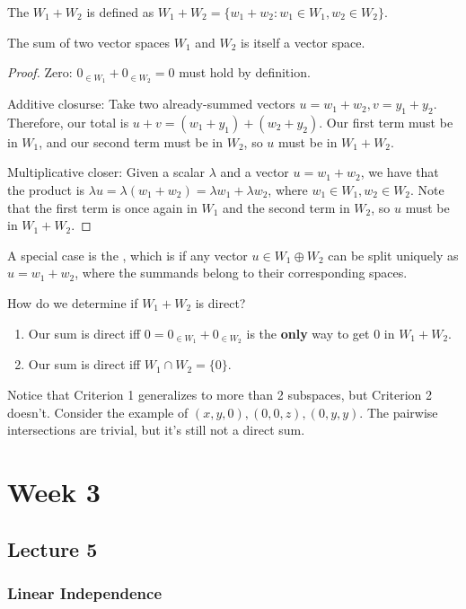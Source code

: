 \documentclass{book}
\begin{document}
\begin{definition}
	The  $W_1 + W_2$ is defined as $W_1 + W_2 = \{w_1 + w_2 : w_1 \in W_1, w_2 \in W_2\}$.
\end{definition}

\begin{theorem}
	The sum of two vector spaces $W_1$ and $W_2$ is itself a vector space.
\end{theorem}

\begin{proof}
	Zero: $0_{\in W_1} + 0_{\in W_2} = 0$ must hold by definition.

	Additive closurse: Take two already-summed vectors $u = w_1 + w_2, v = y_1 + y_2$. Therefore, our total is $u + v = (w_1 + y_1) + (w_2 + y_2)$. Our first term must be in $W_1$, and our second term must be in $W_2$, so $u$ must be in $W_1 + W_2$.

	Multiplicative closer: Given a scalar $\lambda$ and a vector $u = w_1 + w_2$, we have that the product is $\lambda u = \lambda(w_1 + w_2) = \lambda w_1 + \lambda w_2$, where $w_1 \in W_1, w_2 \in W_2$. Note that the first term is once again in $W_1$ and the second term in $W_2$, so $u$ must be in $W_1 + W_2$.
\end{proof}

A special case is the , which is if any vector $u \in W_1 \oplus W_2$ can be split uniquely as $u = w_1 + w_2$, where the summands belong to their corresponding spaces.

How do we determine if $W_1 + W_2$ is direct?
\begin{enumerate}
	\item Our sum is direct iff $0 = 0_{\in W_1} + 0_{\in W_2}$ is the \textbf{only} way to get $0$ in $W_1 + W_2$.
	\item Our sum is direct iff $W_1 \cap W_2 = \{0\}$.
\end{enumerate}

Notice that Criterion 1 generalizes to more than 2 subspaces, but Criterion 2 doesn't. Consider the example of $(x, y, 0), (0, 0, z), (0, y, y)$. The pairwise intersections are trivial, but it's still not a direct sum.

\chapter{Week 3}
\section{Lecture 5}
\subsection{Linear Independence}
\end{document}
